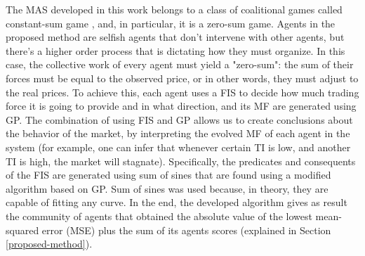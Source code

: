 \documentclass[a4paper,twoside]{article}
\begin{document}


The MAS developed in this work belongs to a class of coalitional games
called constant-sum game \cite{Shoham2009}, and, in particular, it is
a zero-sum game. Agents in the proposed method are selfish agents that
don't intervene with other agents, but there's a higher order process
that is dictating how they must organize. In this case, the collective
work of every agent must yield a "zero-sum": the sum of their forces
must be equal to the observed price, or in other words, they must
adjust to the real prices. To achieve this, each agent uses a FIS to
decide how much trading force it is going to provide and in what
direction, and its MF are generated using GP. The combination of using
FIS and GP allows us to create conclusions about the behavior of the
market, by interpreting the evolved MF of each agent in the system
(for example, one can infer that whenever certain TI is low, and
another TI is high, the market will stagnate). Specifically, the
predicates and consequents of the FIS are generated using sum of sines
that are found using a modified algorithm based on GP. Sum of sines
was used because, in theory, they are capable of fitting any curve. In
the end, the developed algorithm gives as result the community of
agents that obtained the absolute value of the lowest mean-squared
error (MSE) plus the sum of its agents scores (explained in Section
\ref{proposed-method}). 

\end{document}
